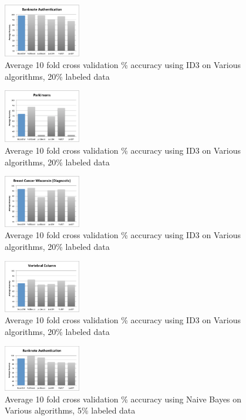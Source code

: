 \documentclass{sig-alternate}
\begin{document}
\begin{figure}
\centering
\includegraphics[width=0.3\textwidth]{figures/bankAcc.pdf}
\caption{Average 10 fold cross validation \% accuracy using ID3 on Various algorithms, 20\% labeled data}
\label{bankAcc}
\end{figure}
\begin{figure}
\centering
\includegraphics[width=0.3\textwidth]{figures/parkAcc.pdf}
\caption{Average 10 fold cross validation \% accuracy using ID3 on Various algorithms, 20\% labeled data}
\label{parkAcc}
\end{figure}

\begin{figure}
\centering
\includegraphics[width=0.3\textwidth]{figures/breaAcc.pdf}
\caption{Average 10 fold cross validation \% accuracy using ID3 on Various algorithms, 20\% labeled data}
\label{breaAcc}
\end{figure}

\begin{figure}
\centering
\includegraphics[width=0.3\textwidth]{figures/vertAcc.pdf}
\caption{Average 10 fold cross validation \% accuracy using ID3 on Various algorithms, 20\% labeled data}
\label{vertAcc}
\end{figure}

\begin{figure}
\centering
\includegraphics[width=0.3\textwidth]{figures/bankAcc5.pdf}
\caption{Average 10 fold cross validation \% accuracy using Naive Bayes on Various algorithms, 5\% labeled data}
\label{vertAcc}
\end{figure}
\end{document}
